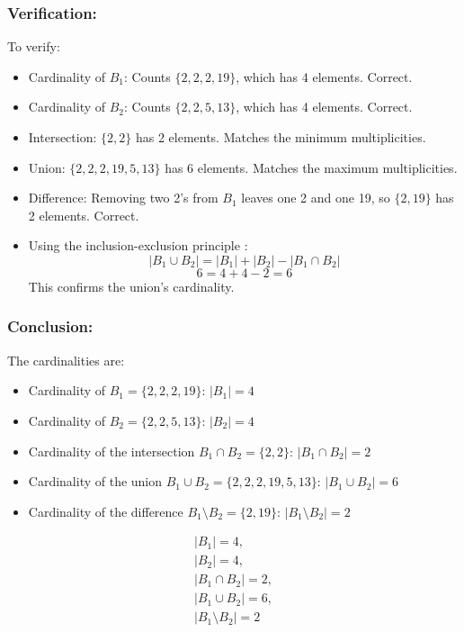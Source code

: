 \documentclass[12pt, a4paper, twoside]{report} %
\begin{document}
\subsubsection*{Verification:}
To verify:
\begin{itemize}
  \item Cardinality of \( B_1 \): Counts \( \{2, 2, 2, 19\} \), which has 4 elements. Correct.
  \item Cardinality of \( B_2 \): Counts \( \{2, 2, 5, 13\} \), which has 4 elements. Correct.
  \item Intersection: \( \{2, 2\} \) has 2 elements. Matches the minimum multiplicities.
  \item Union: \( \{2, 2, 2, 19, 5, 13\} \) has 6 elements. Matches the maximum multiplicities.
  \item Difference: Removing two 2’s from \( B_1 \) leaves one 2 and one 19, so \( \{2, 19\} \) has 2 elements. Correct.
  \item Using the inclusion-exclusion principle \cite{rosen2019}:
    \[
    |B_1 \cup B_2| = |B_1| + |B_2| - |B_1 \cap B_2|
    \]
    \[
    6 = 4 + 4 - 2 = 6
    \]
    This confirms the union’s cardinality.
\end{itemize}

\subsubsection*{Conclusion:}
The cardinalities are:
\begin{itemize}
  \item Cardinality of \( B_1 = \{2, 2, 2, 19\} \): \( |B_1| = 4 \)
  \item Cardinality of \( B_2 = \{2, 2, 5, 13\} \): \( |B_2| = 4 \)
  \item Cardinality of the intersection \( B_1 \cap B_2 = \{2, 2\} \): \( |B_1 \cap B_2| = 2 \)
  \item Cardinality of the union \( B_1 \cup B_2 = \{2, 2, 2, 19, 5, 13\} \): \( |B_1 \cup B_2| = 6 \)
  \item Cardinality of the difference \( B_1 \setminus B_2 = \{2, 19\} \): \( |B_1 \setminus B_2| = 2 \)
\end{itemize}
\[
\boxed{
\begin{array}{l}
|B_1| = 4, \\
|B_2| = 4, \\
|B_1 \cap B_2| = 2, \\
|B_1 \cup B_2| = 6, \\
|B_1 \setminus B_2| = 2
\end{array}
}
\]
\end{document}
